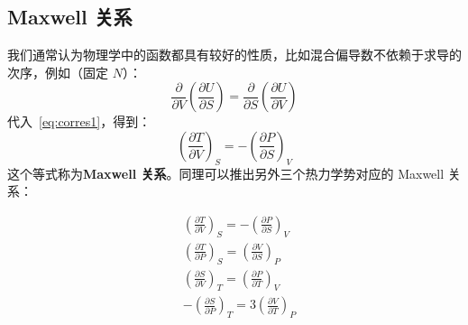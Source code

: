 \subsection{Maxwell 关系}
我们通常认为物理学中的函数都具有较好的性质，比如混合偏导数不依赖于求导的次序，例如（固定 $N$）：
\begin{equation}
    \frac{\partial}{\partial V}\left(\frac{\partial U}{\partial S}\right) = \frac{\partial}{\partial S}\left(\frac{\partial U}{\partial V}\right)
\end{equation}
代入~\eqref{eq:corres1}，得到：
\begin{equation}
    \left(\frac{\partial T}{\partial V}\right)_{S} = -\left(\frac{\partial P}{\partial S}\right)_{V}
\end{equation}
这个等式称为\textbf{Maxwell 关系}。同理可以推出另外三个热力学势对应的 Maxwell 关系：
\begin{corollary}[Maxwell 关系（固定 $N$ 不变）]
    \begin{align}
        &\left(\frac{\partial T}{\partial V}\right)_S = -\left(\frac{\partial P}{\partial S}\right)_V\\
        &\left(\frac{\partial T}{\partial P}\right)_S = \left(\frac{\partial V}{\partial S}\right)_P\\
        &\left(\frac{\partial S}{\partial V}\right)_T = \left(\frac{\partial P}{\partial T}\right)_V\\
        &-\left(\frac{\partial S}{\partial P}\right)_T = 3\left(\frac{\partial V}{\partial T}\right)_P
    \end{align}
\end{corollary}

